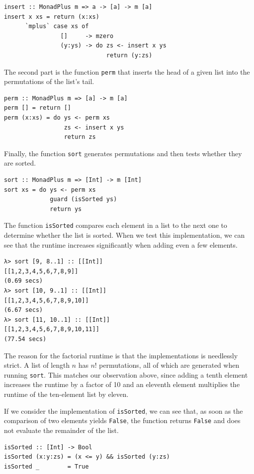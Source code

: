 \documentclass[a4paper, 11pt, fleqn, twoside]{scrreprt}
\newcommand{\hinl}[1]{\texttt{#1}}
\begin{document}
\begin{verbatim}
insert :: MonadPlus m => a -> [a] -> m [a]
insert x xs = return (x:xs)
      `mplus` case xs of
                []     -> mzero
                (y:ys) -> do zs <- insert x ys
                             return (y:zs)
\end{verbatim}

The second part is the function \hinl{perm} that inserts the head of a given list into the permutations of the list's tail.

\begin{verbatim}
perm :: MonadPlus m => [a] -> m [a]
perm [] = return []
perm (x:xs) = do ys <- perm xs
                 zs <- insert x ys
                 return zs
\end{verbatim}

Finally, the function \hinl{sort} generates permutations and then tests whether they are sorted.

\begin{verbatim}
sort :: MonadPlus m => [Int] -> m [Int]
sort xs = do ys <- perm xs
             guard (isSorted ys)
             return ys
\end{verbatim}

The function \hinl{isSorted} compares each element in a list to the next one to determine whether the list is sorted.
When we test this implementation, we can see that the runtime increases significantly when adding even a few elements.

\begin{verbatim}
λ> sort [9, 8..1] :: [[Int]]
[[1,2,3,4,5,6,7,8,9]]
(0.69 secs)
λ> sort [10, 9..1] :: [[Int]]
[[1,2,3,4,5,6,7,8,9,10]]
(6.67 secs)
λ> sort [11, 10..1] :: [[Int]]
[[1,2,3,4,5,6,7,8,9,10,11]]
(77.54 secs)
\end{verbatim}

The reason for the factorial runtime is that the implementations is needlessly strict.
A list of length $n$  has $n!$ permutations, all of which are generated when running \hinl{sort}.
This matches our observation above, since adding a tenth element increases the runtime by a factor of 10 and an eleventh element multiplies the runtime of the ten-element list by eleven.

If we consider the implementation of \hinl{isSorted}, we can see that, as soon as the comparison of two elements yields \hinl{False}, the function returns \hinl{False} and does not evaluate the remainder of the list.

\begin{verbatim}
isSorted :: [Int] -> Bool
isSorted (x:y:zs) = (x <= y) && isSorted (y:zs)
isSorted _        = True
\end{verbatim}
\end{document}
